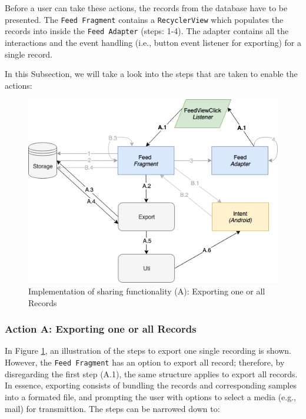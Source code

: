 Before a user can take these actions, the records from the database have to be presented. The \verb|Feed Fragment| contains a \verb|RecyclerView| which populates the records into inside the \verb|Feed Adapter| (steps: 1-4). The adapter contains all the interactions and the event handling (i.e., button event listener for exporting) for a single record. 

In this Subsection, we will take a look into the steps that are taken to enable the actions:

\begin{figure}
    \centering
    \includegraphics[scale=0.6]{images/Sharing_ImpA.png}
    \caption{Implementation of sharing functionality (A): Exporting one or all Records}
    \label{fig:impl_sharingA}
\end{figure}

\subsubsection{Action A: Exporting one or all Records}
In Figure \ref{fig:impl_sharingA}, an illustration of the steps to export one single recording is shown. However, the \verb|Feed Fragment| has an option to export all record; therefore, by disregarding the first step (A.1), the same structure applies to export all records. In essence, exporting consists of bundling the records and corresponding samples into a formated file, and prompting the user with options to select a media (e.g., mail) for transmittion. The steps can be narrowed down to: 

